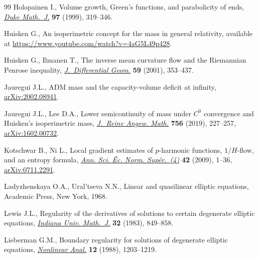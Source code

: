 \begin{thebibliography}{99}
Holopainen I., Volume growth, {G}reen's functions, and parabolicity of ends,
 \href{https://doi.org/10.1215/S0012-7094-99-09714-4}{\textit{Duke Math.~J.}} \textbf{97} (1999), 319--346.

Huisken G., An isoperimetric concept for the mass in general relativity,
 available at \url{https://www.youtube.com/watch?v=4aG5L49p428}.

Huisken G., Ilmanen T., The inverse mean curvature flow and the {R}iemannian
 {P}enrose inequality, \href{https://doi.org/10.4310/jdg/1090349447}{\textit{J.~Differential Geom.}} \textbf{59} (2001),
 353--437.

Jauregui J.L., {ADM} mass and the capacity-volume deficit at infinity,
 \href{https://arxiv.org/abs/2002.08941}{arXiv:2002.08941}.

Jauregui J.L., Lee D.A., Lower semicontinuity of mass under {$C^0$} convergence
 and {H}uisken's isoperimetric mass, \href{https://doi.org/10.1515/crelle-2017-0007}{\textit{J.~Reine Angew. Math.}}
 \textbf{756} (2019), 227--257, \href{https://arxiv.org/abs/1602.00732}{arXiv:1602.00732}.

Kotschwar B., Ni L., Local gradient estimates of {$p$}-harmonic functions,
 {$1/H$}-flow, and an entropy formula, \href{https://doi.org/10.24033/asens.2089}{\textit{Ann. Sci. \'Ec. Norm.
 Sup\'er.~(4)}} \textbf{42} (2009), 1--36, \href{https://arxiv.org/abs/0711.2291}{arXiv:0711.2291}.

Ladyzhenskaya O.A., Ural'tseva N.N., Linear and quasilinear elliptic equations,
 Academic Press, New York, 1968.

Lewis J.L., Regularity of the derivatives of solutions to certain degenerate
 elliptic equations, \href{https://doi.org/10.1512/iumj.1983.32.32058}{\textit{Indiana Univ. Math.~J.}} \textbf{32} (1983),
 849--858.

Lieberman G.M., Boundary regularity for solutions of degenerate elliptic
 equations, \href{https://doi.org/10.1016/0362-546X(88)90053-3}{\textit{Nonlinear Anal.}} \textbf{12} (1988), 1203--1219.


\end{thebibliography}
